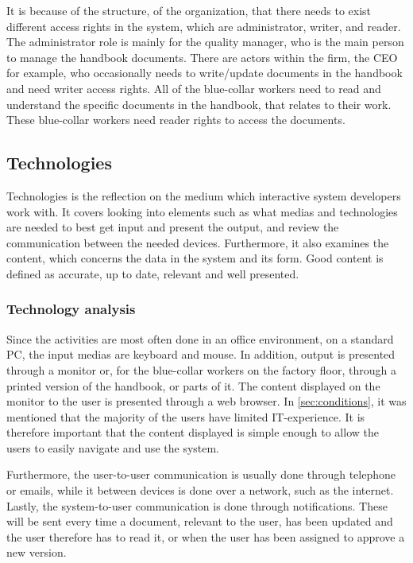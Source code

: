 It is because of the structure, of the organization, that there needs to exist different access rights in the system, which are administrator, writer, and reader.
The administrator role is mainly for the quality manager, who is the main person to manage the handbook documents.
There are actors within the firm, the CEO for example, who occasionally needs to write/update documents in the handbook and need writer access rights.
All of the blue-collar workers need to read and understand the specific documents in the handbook, that relates to their work.
These blue-collar workers need reader rights to access the documents.

\subsection{Technologies}
Technologies is the reflection on the medium which interactive system developers work with.
It covers looking into elements such as what medias and technologies are needed to best get input and present the output, and review the communication between the needed devices.
Furthermore, it also examines the content, which concerns the data in the system and its form.
Good content is defined as accurate, up to date, relevant and well presented.

\subsubsection*{Technology analysis}
Since the activities are most often done in an office environment, on a standard PC, the input medias are keyboard and mouse.
In addition, output is presented through a monitor or, for the blue-collar workers on the factory floor, through a printed version of the handbook, or parts of it.
The content displayed on the monitor to the user is presented through a web browser.
In \cref{sec:conditions}, it was mentioned that the majority of the users have limited IT-experience.
It is therefore important that the content displayed is simple enough to allow the users to easily navigate and use the system.

Furthermore, the user-to-user communication is usually done through telephone or emails, while it between devices is done over a network, such as the internet.
Lastly, the system-to-user communication is done through notifications.
These will be sent every time a document, relevant to the user, has been updated and the user therefore has to read it, or when the user has been assigned to approve a new version.